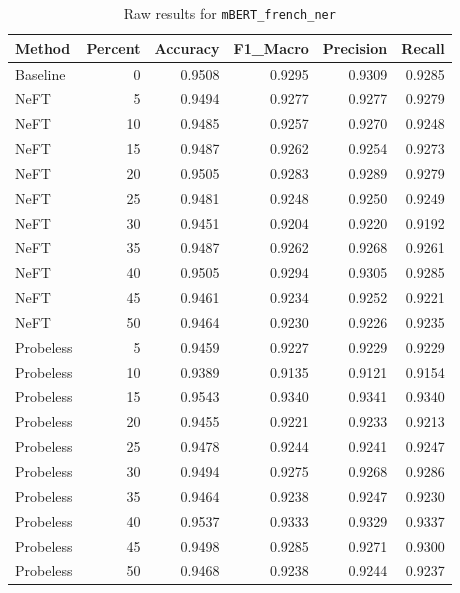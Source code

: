 \documentclass[12pt]{article}
\begin{document}
\begin{table}[H]
\centering
\caption{Raw results for \texttt{mBERT\_french\_ner}}
\label{tab:mbert-french-ner}
\begin{tabular}{lrrrrr}
\toprule
Method & Percent & Accuracy & F1\_Macro & Precision & Recall \\
\midrule
Baseline & 0 & 0.9508 & 0.9295 & 0.9309 & 0.9285 \\
NeFT & 5 & 0.9494 & 0.9277 & 0.9277 & 0.9279 \\
NeFT & 10 & 0.9485 & 0.9257 & 0.9270 & 0.9248 \\
NeFT & 15 & 0.9487 & 0.9262 & 0.9254 & 0.9273 \\
NeFT & 20 & 0.9505 & 0.9283 & 0.9289 & 0.9279 \\
NeFT & 25 & 0.9481 & 0.9248 & 0.9250 & 0.9249 \\
NeFT & 30 & 0.9451 & 0.9204 & 0.9220 & 0.9192 \\
NeFT & 35 & 0.9487 & 0.9262 & 0.9268 & 0.9261 \\
NeFT & 40 & 0.9505 & 0.9294 & 0.9305 & 0.9285 \\
NeFT & 45 & 0.9461 & 0.9234 & 0.9252 & 0.9221 \\
NeFT & 50 & 0.9464 & 0.9230 & 0.9226 & 0.9235 \\
Probeless & 5 & 0.9459 & 0.9227 & 0.9229 & 0.9229 \\
Probeless & 10 & 0.9389 & 0.9135 & 0.9121 & 0.9154 \\
Probeless & 15 & 0.9543 & 0.9340 & 0.9341 & 0.9340 \\
Probeless & 20 & 0.9455 & 0.9221 & 0.9233 & 0.9213 \\
Probeless & 25 & 0.9478 & 0.9244 & 0.9241 & 0.9247 \\
Probeless & 30 & 0.9494 & 0.9275 & 0.9268 & 0.9286 \\
Probeless & 35 & 0.9464 & 0.9238 & 0.9247 & 0.9230 \\
Probeless & 40 & 0.9537 & 0.9333 & 0.9329 & 0.9337 \\
Probeless & 45 & 0.9498 & 0.9285 & 0.9271 & 0.9300 \\
Probeless & 50 & 0.9468 & 0.9238 & 0.9244 & 0.9237 \\
\bottomrule
\end{tabular}
\end{table}
\end{document}
